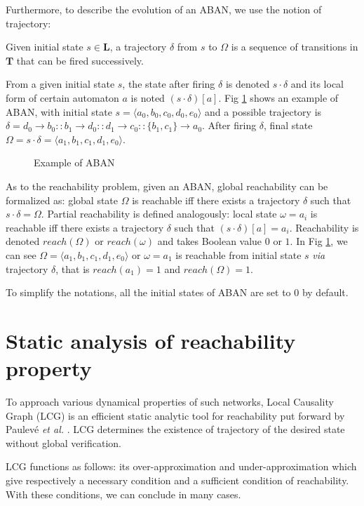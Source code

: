 \documentclass[runningheads]{llncs}
\newcommand{\acm}[3]{#1\rightarrow#2}
\begin{document}
Furthermore, to describe the evolution of an ABAN, we use the notion of trajectory:
\begin{definition}[Trajectory]
Given initial state $s\in \mathbf{L}$, a trajectory $\delta$ from $s$ to $\Omega$ is a sequence of transitions in $\mathbf{T}$ that can be fired successively. %
\end{definition}

From a given initial state $s$, the state after firing $\delta$ is denoted $s\cdot \delta$ and its local form of certain automaton $a$ is noted $(s\cdot \delta)[a]$.
Fig \ref{fig:1} shows an example of ABAN, with initial state $s=\langle a_0,b_0,c_0,d_0,e_0\rangle$ and a possible trajectory is $\delta=\acm{d_0}{b_0}{b_1}::\acm{b_1}{d_0}{d_1}::\acm{d_1}{c_0}{c_1}::\acm{\{b_1,c_1\}}{a_0}{a_1}$. After firing $\delta$, final state $\Omega=s\cdot \delta=\langle a_1,b_1,c_1,d_1,e_0\rangle$.

\begin{figure}[ht]
\centering

\caption{Example of ABAN}\label{fig:1}
\end{figure}	
As to the reachability problem, given an ABAN, global reachability can be formalized as: global state $\Omega$ is reachable iff there exists a trajectory $\delta$ such that $s\cdot \delta=\Omega$. 
Partial reachability is defined analogously: local state $\omega=a_i$ is reachable iff there exists a trajectory $\delta$ such that $(s\cdot \delta)[a]=a_i$.
Reachability is denoted $reach (\Omega)$ or $reach(\omega)$ and takes Boolean value $0$ or $1$.
In Fig \ref{fig:1}, we can see $\Omega=\langle a_1,b_1,c_1,d_1,e_0\rangle$ or $\omega=a_1$ is reachable from initial state $s$ \textit{via} trajectory $\delta$, that is $reach(a_1)=1$ and $reach(\Omega)=1$. 

To simplify the notations, all the initial states of ABAN are set to 0 by default.
\section{Static analysis of reachability property}\label{sect:3}
To approach various dynamical properties of such networks, Local Causality Graph (LCG) is an efficient static analytic tool for reachability put forward by Paulev\'e \textit{et al.} \cite{pauleve2011}. 
LCG determines the existence of trajectory of the desired state without global verification.

LCG functions as follows: its over-approximation and under-approximation which give respectively a necessary condition and a sufficient condition of reachability. 
With these conditions, we can conclude in many cases.%
\end{document}
